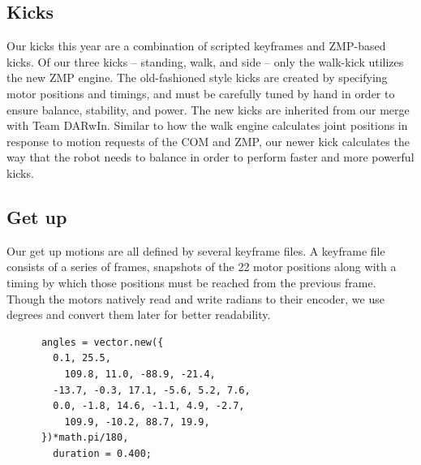 \documentclass{article}
\begin{document}
  \subsection{Kicks}
	  Our kicks this year are a combination of scripted keyframes and ZMP-based kicks. Of our three kicks -- standing, walk, and side -- only the walk-kick utilizes the new ZMP engine. The old-fashioned style kicks are created by specifying motor positions and timings, and must be carefully tuned by hand in order to ensure balance, stability, and power. The new kicks are inherited from our merge with Team DARwIn. Similar to how the walk engine calculates joint positions in response to motion requests of the COM and ZMP, our newer kick calculates the way that the robot needs to balance in order to perform faster and more powerful kicks.  

  \subsection{Get up}
	  Our get up motions are all defined by several keyframe files. A keyframe file consists of a series of frames, snapshots of the 22 motor positions along with a timing by which those positions must be reached from the previous frame. Though the motors natively read and write radians to their encoder, we use degrees and convert them later for better readability.
	  \begin{lstlisting}
  	  angles = vector.new({
	  	0.1, 25.5,
		  109.8, 11.0, -88.9, -21.4,
  		-13.7, -0.3, 17.1, -5.6, 5.2, 7.6,
	  	0.0, -1.8, 14.6, -1.1, 4.9, -2.7,
		  109.9, -10.2, 88.7, 19.9,
  	  })*math.pi/180,
	    duration = 0.400;
	  \end{lstlisting}
\end{document}

